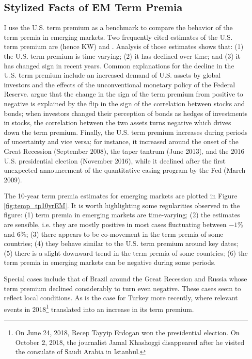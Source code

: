 \subsection{Stylized Facts of EM Term Premia}
I use the U.S. term premium as a benchmark to compare the behavior of the term premia in emerging markets. Two frequently cited estimates of the U.S. term premium are \cite{KimWright:2005} (hence KW) and \cite*{ACM:2013}. Analysis of those estimates shows that: (1) the U.S. term premium is time-varying; (2) it has declined over time; and (3) it has changed sign in recent years. Common explanations for the decline in the U.S. term premium include an increased demand of U.S. assets by global investors and the effects of the unconventional monetary policy of the Federal Reserve. \cite*{CampbellSunderamViceira:2017} argue that the change in the sign of the term premium from positive to negative is explained by the flip in the sign of the correlation between stocks and bonds; when investors changed their perception of bonds as hedges of investments in stocks, the correlation between the two assets turns negative which drives down the term premium. Finally, the U.S. term premium increases during periods of uncertainty and vice versa; for instance, it increased around the onset of the Great Recession (September 2008), the taper tantrum (June 2013), and the 2016 U.S. presidential election (November 2016), while it declined after the first unexpected announcement of the quantitative easing program by the Fed (March 2009).

The 10-year term premia estimates for emerging markets are plotted in Figure \ref{fig:temp_tp10yrEM}. It is worth highlighting some regularities observed in the figure: (1) term premia in emerging markets are time-varying; (2) the estimates are sensible, i.e. they are mostly positive in most cases fluctuating between $-1$\% and $6$\%; (3) there appears to be co-movement in the term premia of some countries; (4) they behave similar to the U.S. term premium around key dates; (5) there is a slight downward trend in the term premia of some countries; (6) the term premia in emerging markets can be negative during some periods.
	

Special cases include that of Brazil around the Great Recession and Russia whose term premium declined considerably to turn even negative. These cases seem to reflect local conditions. As is the case for Turkey more recently, where relevant events in 2018\footnote{On June 24, 2018, Recep Tayyip Erdogan won the presidential election. On October 2, 2018, the journalist Jamal Khashoggi disappeared after he visited the consulate of Saudi Arabia in Istanbul.} translated into an increase in its term premium.

